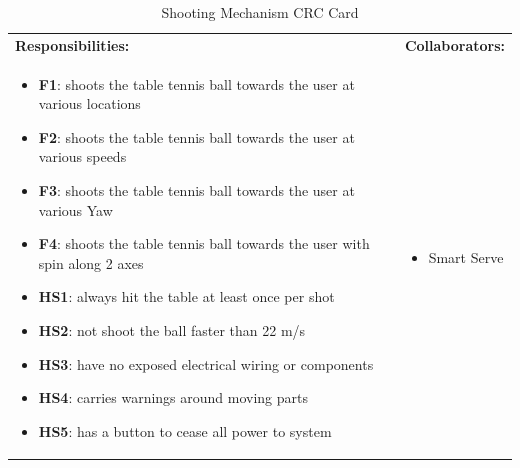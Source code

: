 \documentclass[11pt]{article}
\begin{document}
\begin{table}[H]
\centering
\label{my-label}
\begin{tabular}{ | >{\raggedright\arraybackslash}p{} | >{\raggedright\arraybackslash}p{} | }
\hline
\multicolumn{2}{|c|}{\textbf{Smart Serve}}             \\ \hline
\textbf{Responsibilities:} & \textbf{Collaborators:} \\ \hline
\begin{itemize}
\item \textbf{F1}: shoots the table tennis ball towards the user at various locations
\item \textbf{F2}: shoots the table tennis ball towards the user at various speeds
\item \textbf{F3}: shoots the table tennis ball towards the user at various Yaw
\item \textbf{F4}: shoots the table tennis ball towards the user with spin along 2 axes
\item \textbf{HS1}: always hit the table at least once per shot
\item \textbf{HS2}: not shoot the ball faster than 22 m/s
\item \textbf{HS3}: have no exposed electrical wiring or components
\item \textbf{HS4}: carries warnings around moving parts
\item \textbf{HS5}: has a button to cease all power to system
\end{itemize}
&
\begin{itemize}
\item Smart Serve
\end{itemize} \\ \hline
\end{tabular}
\caption{Shooting Mechanism CRC Card}
\end{table}
\end{document}
